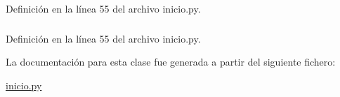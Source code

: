 Definición en la línea 55 del archivo inicio.py.

\hypertarget{classinicio_1_1prueba__teleoperacion_a328134cba69cbba0ff42423198028717}{
\subsubsection[{teleoper}]{}}
\label{classinicio_1_1prueba__teleoperacion_a328134cba69cbba0ff42423198028717}


Definición en la línea 55 del archivo inicio.py.



La documentación para esta clase fue generada a partir del siguiente fichero:\begin{DoxyCompactItemize}
\item 
\hyperlink{inicio_8py}{inicio.py}\end{DoxyCompactItemize}
